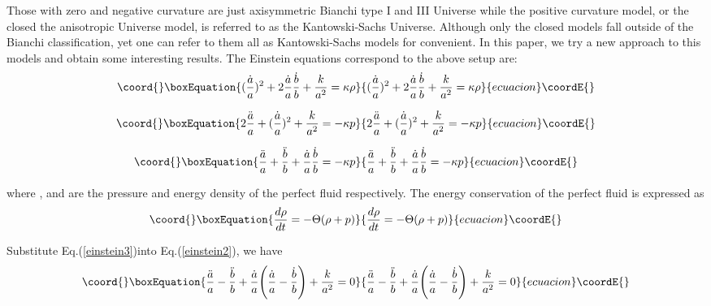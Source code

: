 \documentclass[a4paper,preprint]{revtex4}
\begin{document}
Those with zero and negative curvature are just axisymmetric
Bianchi type I and III Universe while the positive curvature
model, or the closed the anisotropic Universe model, is referred
to as the Kantowski-Sachs Universe. Although only the closed
models fall outside of the Bianchi classification, yet one can
refer to them all as Kantowski-Sachs models for
convenient\cite{barrow}. In this paper, we try a new approach to
this models and obtain some interesting results. The Einstein
equations correspond to the above setup are:
\begin{equation}\coord{}\boxEquation{\label{einstein1}
(\frac{\dot{a}}{a})^2+2\frac{\dot{a}}{a}\frac{\dot{b}}{b}+\frac{k}{a^2}=\kappa\rho
}{(\frac{\dot{a}}{a})^2+2\frac{\dot{a}}{a}\frac{\dot{b}}{b}+\frac{k}{a^2}=\kappa\rho
}{ecuacion}\coordE{}\end{equation}

\begin{equation}\coord{}\boxEquation{\label{einstein2}
 2\frac{\ddot{a}}{a}+(\frac{\dot{a}}{a})^2+\frac{k}{a^2}=-\kappa p
}{2\frac{\ddot{a}}{a}+(\frac{\dot{a}}{a})^2+\frac{k}{a^2}=-\kappa p
}{ecuacion}\coordE{}\end{equation}

\begin{equation}\coord{}\boxEquation{\label{einstein3}
  \frac{\ddot{a}}{a}+\frac{\ddot{b}}{b}+\frac{\dot{a}}{a}\frac{\dot{b}}{b}=-\kappa
  p
}{\frac{\ddot{a}}{a}+\frac{\ddot{b}}{b}+\frac{\dot{a}}{a}\frac{\dot{b}}{b}=-\kappa
  p
}{ecuacion}\coordE{}\end{equation}

\noindent where \coordHE{}, \coordHE{} and \myHighlight{$\rho$}\coordHE{} are the pressure
and energy density of the perfect fluid respectively. The energy
conservation of the perfect fluid is expressed as
\begin{equation}\coord{}\boxEquation{\label{conservation}
\frac{d \rho}{dt}=-\Theta (\rho+p)
}{\frac{d \rho}{dt}=-\Theta (\rho+p)
}{ecuacion}\coordE{}\end{equation}


\noindent Substitute Eq.(\ref{einstein3})into
Eq.(\ref{einstein2}), we have
\begin{equation}\coord{}\boxEquation{\label{transform}
\frac{\ddot{a}}{a}-\frac{\ddot{b}}{b}+\frac{\dot{a}}{a}\Bigg(\frac{\dot{a}}
{a}-\frac{\dot{b}}{b}\Bigg)+\frac{k}{a^2}=0
}{\frac{\ddot{a}}{a}-\frac{\ddot{b}}{b}+\frac{\dot{a}}{a}\Bigg(\frac{\dot{a}}
{a}-\frac{\dot{b}}{b}\Bigg)+\frac{k}{a^2}=0
}{ecuacion}\coordE{}\end{equation}
\end{document}
